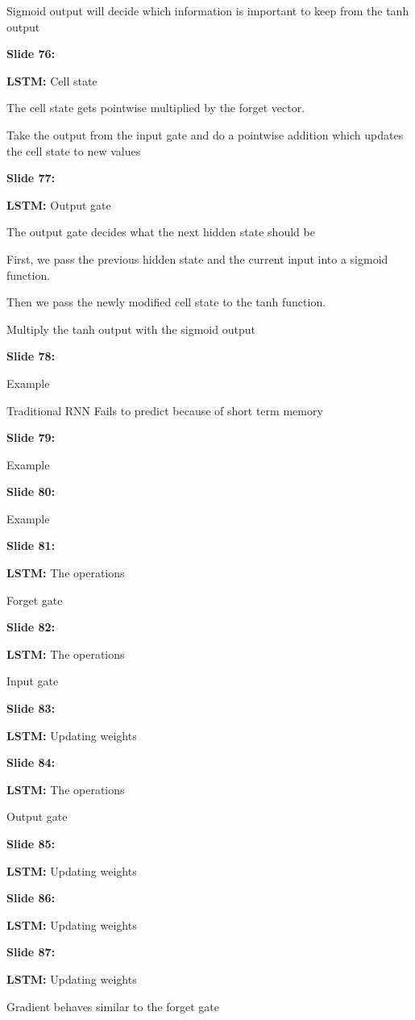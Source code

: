 \documentclass[11pt,a4paper]{article}
\begin{document}
Sigmoid output will decide which information is important to keep from the tanh output

\textbf{Slide 76:}

\textbf{LSTM:}  Cell state

The cell state gets pointwise multiplied by the forget vector.

Take the output from the input gate and do a pointwise addition which updates the cell state to new values

\textbf{Slide 77:}

\textbf{LSTM:}  Output gate

The output gate decides what the next hidden state should be

First, we pass the previous hidden state and the current input into a sigmoid function.

Then we pass the newly modified cell state to the tanh function.

Multiply the tanh output with the sigmoid output

\textbf{Slide 78:}

Example

Traditional RNN Fails to predict because of short term memory

\textbf{Slide 79:}

Example

\textbf{Slide 80:}

Example

\textbf{Slide 81:}

\textbf{LSTM:}  The operations

Forget gate

\textbf{Slide 82:}

\textbf{LSTM:}  The operations

Input gate

\textbf{Slide 83:}

\textbf{LSTM:}  Updating weights

\textbf{Slide 84:}

\textbf{LSTM:}  The operations

Output gate

\textbf{Slide 85:}

\textbf{LSTM:}  Updating weights

\textbf{Slide 86:}

\textbf{LSTM:}  Updating weights

\textbf{Slide 87:}

\textbf{LSTM:}  Updating weights

Gradient behaves similar to the forget gate
\end{document}

